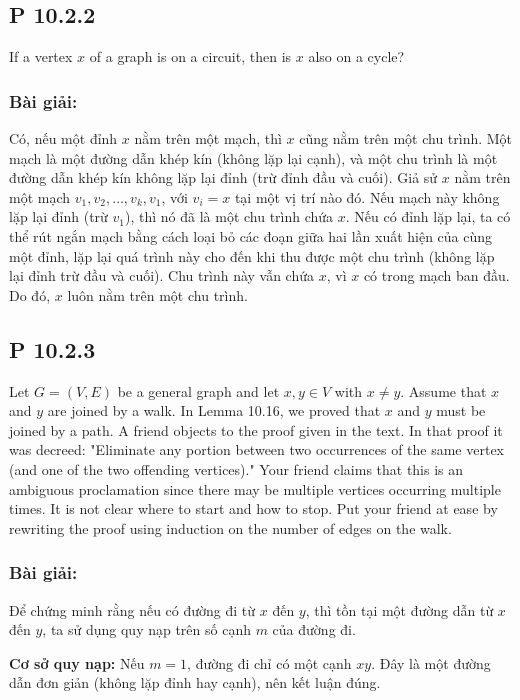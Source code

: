 \documentclass[a4paper,12pt]{article}
\begin{document}
\subsection*{P 10.2.2}
If a vertex \( x \) of a graph is on a circuit, then is \( x \) also on a cycle?

\subsubsection*{Bài giải:} Có, nếu một đỉnh \( x \) nằm trên một mạch, thì \( x \) cũng nằm trên một chu trình. Một mạch là một đường dẫn khép kín (không lặp lại cạnh), và một chu trình là một đường dẫn khép kín không lặp lại đỉnh (trừ đỉnh đầu và cuối). Giả sử \( x \) nằm trên một mạch \( v_1, v_2, \ldots, v_k, v_1 \), với \( v_i = x \) tại một vị trí nào đó. Nếu mạch này không lặp lại đỉnh (trừ \( v_1 \)), thì nó đã là một chu trình chứa \( x \). Nếu có đỉnh lặp lại, ta có thể rút ngắn mạch bằng cách loại bỏ các đoạn giữa hai lần xuất hiện của cùng một đỉnh, lặp lại quá trình này cho đến khi thu được một chu trình (không lặp lại đỉnh trừ đầu và cuối). Chu trình này vẫn chứa \( x \), vì \( x \) có trong mạch ban đầu. Do đó, \( x \) luôn nằm trên một chu trình.

\subsection*{P 10.2.3}
Let \( G = (V, E) \) be a general graph and let \( x, y \in V \) with \( x \neq y \). Assume that \( x \) and \( y \) are joined by a walk. In Lemma 10.16, we proved that \( x \) and \( y \) must be joined by a path. A friend objects to the proof given in the text. In that proof it was decreed: "Eliminate any portion between two occurrences of the same vertex (and one of the two offending vertices)." Your friend claims that this is an ambiguous proclamation since there may be multiple vertices occurring multiple times. It is not clear where to start and how to stop. Put your friend at ease by rewriting the proof using induction on the number of edges on the walk.

\subsubsection*{Bài giải:}
Để chứng minh rằng nếu có đường đi từ \( x \) đến \( y \), thì tồn tại một đường dẫn từ \( x \) đến \( y \), ta sử dụng quy nạp trên số cạnh \( m \) của đường đi.

\textbf{Cơ sở quy nạp:} Nếu \( m = 1 \), đường đi chỉ có một cạnh \( xy \). Đây là một đường dẫn đơn giản (không lặp đỉnh hay cạnh), nên kết luận đúng.
\end{document}
